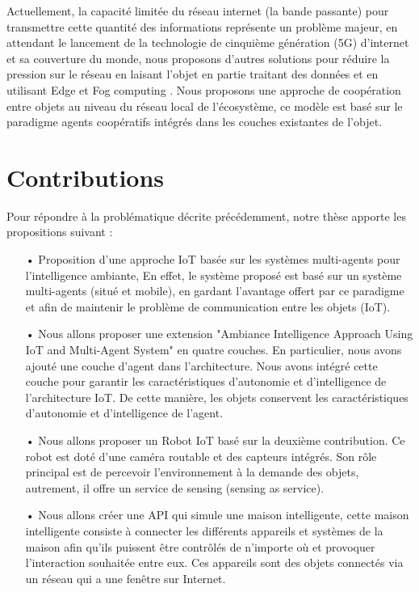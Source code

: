  Actuellement, la capacité limitée du réseau internet (la bande passante) pour transmettre  cette quantité des informations représente un problème majeur, en attendant le lancement de la technologie de cinquième génération (5G) d’internet et sa couverture du monde, nous proposons d’autres solutions pour réduire la pression sur le réseau en laisant l’objet en partie traitant des données et en utilisant Edge et Fog computing . Nous proposons une approche de coopération entre objets au niveau du réseau local de l’écosystème, ce modèle est basé sur le paradigme agents coopératifs intégrés dans les couches existantes de l’objet.
\section*{Contributions}
Pour répondre à la problématique décrite précédemment, notre thèse apporte les propositions suivant :

\begin{itemize}
    \item [•] Proposition d’une approche IoT basée sur les systèmes multi-agents pour l'intelligence ambiante,  En effet, le système proposé est basé sur un système multi-agents (situé et mobile), en gardant l’avantage offert par ce paradigme et afin de maintenir le problème de communication entre les objets (IoT).
 \item [•]	Nous allons proposer une extension "Ambiance Intelligence Approach Using IoT and Multi-Agent System"  en quatre couches. En particulier, nous avons ajouté une couche d’agent dans l’architecture. Nous avons intégré cette couche pour garantir les caractéristiques d’autonomie et d’intelligence de l’architecture IoT. De cette manière, les objets conservent les caractéristiques d’autonomie et d’intelligence de l’agent.
 \item [•]	Nous allons proposer un Robot IoT basé sur la deuxième contribution. Ce robot est doté d’une  caméra routable et des capteurs intégrés. Son rôle principal est de  percevoir l’environnement à la demande des objets, autrement, il offre un service de sensing (sensing as service).
 \item [•]	Nous allons  créer   une API qui simule une maison intelligente, cette maison intelligente consiste à connecter les différents appareils et systèmes de la maison afin qu’ils puissent être contrôlés de n’importe où et provoquer l’interaction souhaitée entre eux. Ces appareils sont des objets connectés via un réseau qui a une fenêtre sur Internet. 

\end{itemize}
 
